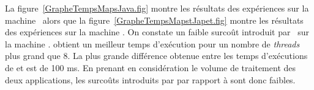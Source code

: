
La figure~\ref{GrapheTempsMapsJava.fig} montre les r\'esultats des exp\'eriences sur la machine \ alors que la figure~\ref{GrapheTempsMapstJapet.fig} montre les r\'esultats des exp\'eriences sur la machine . On constate un faible surco\^ut introduit par \PpFf\ sur la machine .  obtient un meilleur temps d'ex\'ecution pour un nombre de \emph{threads} plus grand que 8. La plus grande diff\'erence obtenue entre les temps d'ex\'ecutions de  et  est de 100 ms. En prenant en consid\'eration le volume de traitement des deux applications, les surco\^uts introduits par  par rapport \`a  sont donc faibles.




